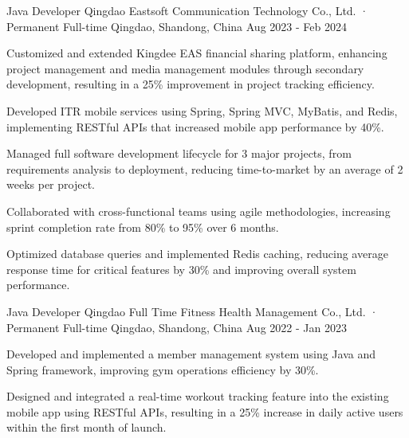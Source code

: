 \begin{cventries}
  \cventry
  {Java Developer} %
  {Qingdao Eastsoft Communication Technology Co., Ltd. · Permanent Full-time} %
  {Qingdao, Shandong, China} %
  {Aug 2023 - Feb 2024} %
  {
    \begin{cvitems} %
      \item {Customized and extended Kingdee EAS financial sharing platform, enhancing project management and media management modules through secondary development, resulting in a 25\% improvement in project tracking efficiency.}
      \item {Developed ITR mobile services using Spring, Spring MVC, MyBatis, and Redis, implementing RESTful APIs that increased mobile app performance by 40\%.}
      \item {Managed full software development lifecycle for 3 major projects, from requirements analysis to deployment, reducing time-to-market by an average of 2 weeks per project.}
      \item {Collaborated with cross-functional teams using agile methodologies, increasing sprint completion rate from 80\% to 95\% over 6 months.}
      \item {Optimized database queries and implemented Redis caching, reducing average response time for critical features by 30\% and improving overall system performance.}
    \end{cvitems}
  }

  \vspace{5mm}

  \cventry
  {Java Developer} %
  {Qingdao Full Time Fitness Health Management Co., Ltd. · Permanent Full-time} %
  {Qingdao, Shandong, China} %
  {Aug 2022 - Jan 2023} %
  {
    \begin{cvitems} %
      \item {Developed and implemented a member management system using Java and Spring framework, improving gym operations efficiency by 30\%.}
      \item {Designed and integrated a real-time workout tracking feature into the existing mobile app using RESTful APIs, resulting in a 25\% increase in daily active users within the first month of launch.}
    \end{cvitems}
  }

  \vspace{5mm}


\end{cventries}
